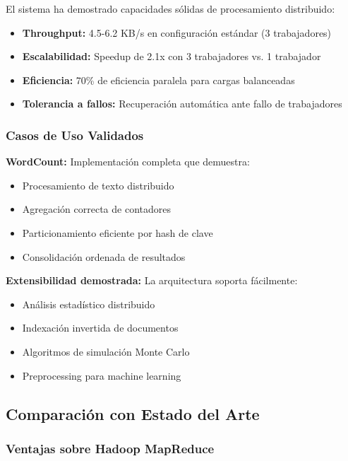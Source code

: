 El sistema ha demostrado capacidades sólidas de procesamiento distribuido:

\begin{itemize}
    \item \textbf{Throughput:} 4.5-6.2 KB/s en configuración estándar (3 trabajadores)
    \item \textbf{Escalabilidad:} Speedup de 2.1x con 3 trabajadores vs. 1 trabajador
    \item \textbf{Eficiencia:} 70\% de eficiencia paralela para cargas balanceadas
    \item \textbf{Tolerancia a fallos:} Recuperación automática ante fallo de trabajadores
\end{itemize}

\subsubsection{Casos de Uso Validados}

\textbf{WordCount:} Implementación completa que demuestra:
\begin{itemize}
    \item Procesamiento de texto distribuido
    \item Agregación correcta de contadores
    \item Particionamiento eficiente por hash de clave
    \item Consolidación ordenada de resultados
\end{itemize}

\textbf{Extensibilidad demostrada:} La arquitectura soporta fácilmente:
\begin{itemize}
    \item Análisis estadístico distribuido
    \item Indexación invertida de documentos
    \item Algoritmos de simulación Monte Carlo
    \item Preprocessing para machine learning
\end{itemize}

\subsection{Comparación con Estado del Arte}

\subsubsection{Ventajas sobre Hadoop MapReduce}

